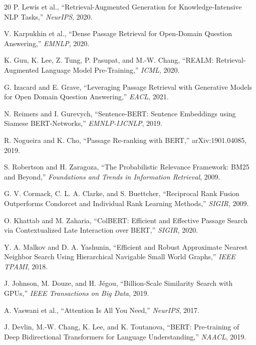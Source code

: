 \documentclass[11pt]{article}
\begin{document}
\clearpage
\begin{thebibliography}{20}
P. Lewis et al., ``Retrieval-Augmented Generation for Knowledge-Intensive NLP Tasks,'' \emph{NeurIPS}, 2020.

V. Karpukhin et al., ``Dense Passage Retrieval for Open-Domain Question Answering,'' \emph{EMNLP}, 2020.

K. Guu, K. Lee, Z. Tung, P. Pasupat, and M.-W. Chang, ``REALM: Retrieval-Augmented Language Model Pre-Training,'' \emph{ICML}, 2020.

G. Izacard and E. Grave, ``Leveraging Passage Retrieval with Generative Models for Open Domain Question Answering,'' \emph{EACL}, 2021.

N. Reimers and I. Gurevych, ``Sentence-BERT: Sentence Embeddings using Siamese BERT-Networks,'' \emph{EMNLP-IJCNLP}, 2019.

R. Nogueira and K. Cho, ``Passage Re-ranking with BERT,'' arXiv:1901.04085, 2019.

S. Robertson and H. Zaragoza, ``The Probabilistic Relevance Framework: BM25 and Beyond,'' \emph{Foundations and Trends in Information Retrieval}, 2009.

G. V. Cormack, C. L. A. Clarke, and S. Buettcher, ``Reciprocal Rank Fusion Outperforms Condorcet and Individual Rank Learning Methods,'' \emph{SIGIR}, 2009.

O. Khattab and M. Zaharia, ``ColBERT: Efficient and Effective Passage Search via Contextualized Late Interaction over BERT,'' \emph{SIGIR}, 2020.

Y. A. Malkov and D. A. Yashunin, ``Efficient and Robust Approximate Nearest Neighbor Search Using Hierarchical Navigable Small World Graphs,'' \emph{IEEE TPAMI}, 2018.

J. Johnson, M. Douze, and H. Jégou, ``Billion-Scale Similarity Search with GPUs,'' \emph{IEEE Transactions on Big Data}, 2019.

A. Vaswani et al., ``Attention Is All You Need,'' \emph{NeurIPS}, 2017.

J. Devlin, M.-W. Chang, K. Lee, and K. Toutanova, ``BERT: Pre-training of Deep Bidirectional Transformers for Language Understanding,'' \emph{NAACL}, 2019.


\end{thebibliography}
\end{document}
